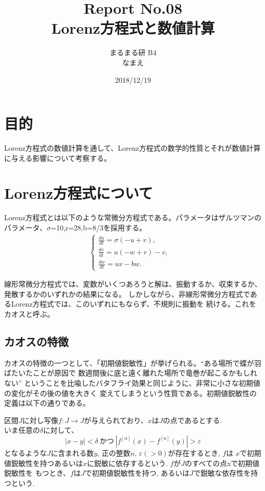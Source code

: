 \documentclass[12pt]{ltjsarticle}
\begin{document}
\begin{titlepage}
\title{Report No.08　\\ Lorenz方程式と数値計算}
\author{まるまる研 B4 \\ なまえ}
\date{2018/12/19}
\maketitle

\end{titlepage}

\section{目的}
Lorenz方程式の数値計算を通して、Lorenz方程式の数学的性質とそれが数値計算に与える影響について考察する。

\section{Lorenz方程式について}
Lorenz方程式とは以下のような常微分方程式である。パラメータはザルツマンのパラメータ、$\sigma$=10,r=28,b=8/3を採用する。
\begin{eqnarray}
    \begin{cases}
        \frac{du}{dt} = \sigma(-u+v), & \\
        \frac{dv}{dt} = u(-w+r)-v, & \\
        \frac{dw}{dt} = uv-bw. &
    \end{cases}
    \label{newton}
\end{eqnarray}

線形常微分方程式では、変数がいくつあろうと解は、振動するか、収束するか、発散するかのいずれかの結果になる。
しかしながら、非線形常微分方程式であるLorenz方程式では、このいずれにもならず、不規則に振動を
続ける。これをカオスと呼ぶ。

\subsection{カオスの特徴}
カオスの特徴の一つとして、「初期値鋭敏性」が挙げられる。“ある場所で蝶が羽ばたいたことが原因で
数週間後に底と遠く離れた場所で竜巻が起こるかもしれない”
ということを比喩したバタフライ効果と同じように、非常に小さな初期値の変化がその後の値を大きく
変えてしまうという性質である。初期値鋭敏性の定義は以下の通りである。\\
\begin{tcolorbox}
    区間$J$に対し写像$f:J \rightarrow J$が与えられており、$x$は$J$の点であるとする.\\
    いま任意の$\delta$に対して、
    \begin{equation*}
        |x-y| < \delta \ かつ \ |f^{[n]}(x) - f^{[n]}(y)| > \varepsilon
    \end{equation*}
    となるような$J$に含まれる数$y$, 正の整数$n$, $\varepsilon(>0)$が存在するとき, $f$は
    $x$で初期値鋭敏性を持つあるいは$x$に鋭敏に依存するという. $f$が$J$のすべての点xで初期値鋭敏性を
    もつとき、$f$は$J$で初期値鋭敏性を持つ, あるいは$J$で鋭敏な依存性を持つという.\cite{chaos}
\end{tcolorbox}
\end{document}
